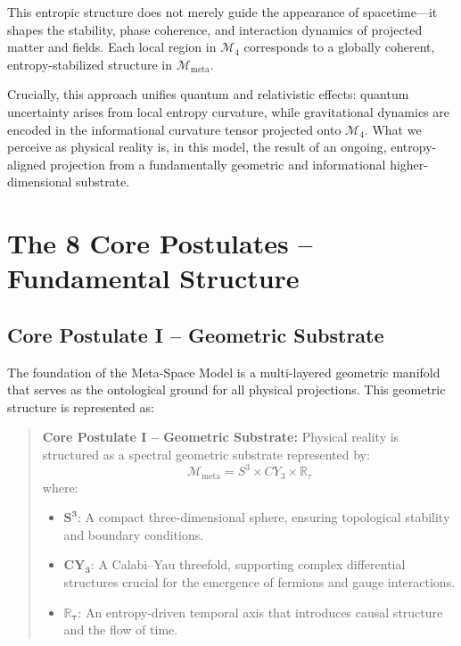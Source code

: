 \documentclass[10.5pt,a4paper]{article}
\begin{document}
This entropic structure does not merely guide the appearance of spacetime—it shapes the stability, phase coherence, and interaction dynamics of projected matter and fields. Each local region in \(\mathcal{M}_4\) corresponds to a globally coherent, entropy-stabilized structure in \(\mathcal{M}_{\text{meta}}\).

Crucially, this approach unifies quantum and relativistic effects: quantum uncertainty arises from local entropy curvature, while gravitational dynamics are encoded in the informational curvature tensor projected onto \(\mathcal{M}_4\). What we perceive as physical reality is, in this model, the result of an ongoing, entropy-aligned projection from a fundamentally geometric and informational higher-dimensional substrate.

\clearpage

\section{The 8 Core Postulates – Fundamental Structure}

\subsection{Core Postulate I – Geometric Substrate}

The foundation of the Meta-Space Model is a multi-layered geometric manifold that serves as the ontological ground for all physical projections. This geometric structure is represented as:

\begin{quote}
\textbf{Core Postulate I – Geometric Substrate:}  
Physical reality is structured as a spectral geometric substrate represented by:
\[
\mathcal{M}_{\text{meta}} = S^3 \times CY_3 \times \mathbb{R}_\tau
\]
where:
\begin{itemize}
    \item \(\mathbf{S^3}\): A compact three-dimensional sphere, ensuring topological stability and boundary conditions.
    \item \(\mathbf{CY_3}\): A Calabi--Yau threefold, supporting complex differential structures crucial for the emergence of fermions and gauge interactions.
    \item \(\mathbf{\mathbb{R}_\tau}\): An entropy-driven temporal axis that introduces causal structure and the flow of time.
\end{itemize}
\end{quote}
\end{document}
